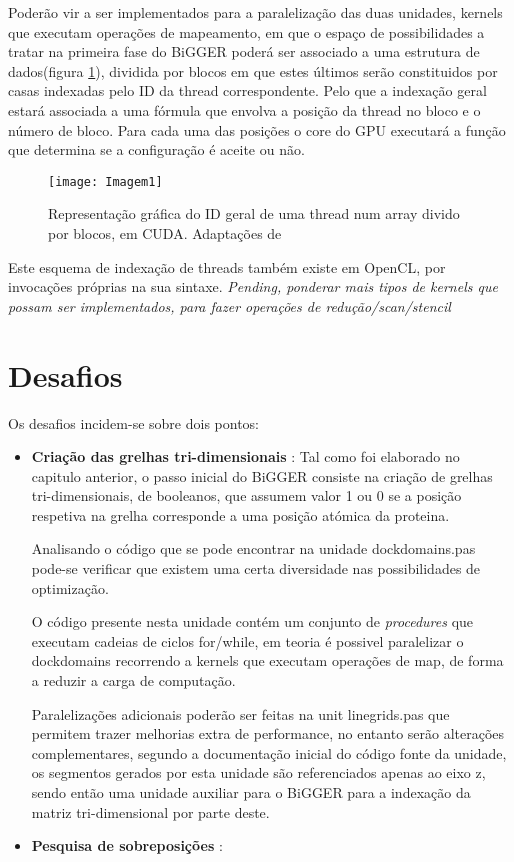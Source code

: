 Poderão vir a ser implementados para a paralelização das duas unidades, kernels que executam operações de mapeamento, em que o espaço de possibilidades a tratar na primeira fase do BiGGER poderá ser associado a uma estrutura de dados(figura \ref{fig:fig3subfig}), dividida por blocos em que estes últimos serão constituidos por casas indexadas pelo ID da thread correspondente. Pelo que a indexação geral estará associada a uma fórmula que envolva a posição da thread no bloco e o número de bloco. Para cada uma das posições o core do GPU executará a função que determina se a configuração é aceite ou não.

\begin{figure}[ht]
  \centering
    {\texttt{[image: Imagem1]}}
  \caption{Representação gráfica do ID geral de uma thread num array divido por blocos, em CUDA. Adaptações de \cite{Sainio2010CUDAEASYA} \cite{zeller2011cuda}}
  \label{fig:fig3subfig}
\end{figure}
Este esquema de indexação de threads também existe em OpenCL, por invocações próprias na sua sintaxe.
\textit{Pending, ponderar mais tipos de kernels que possam ser implementados, para fazer operações de redução/scan/stencil}

\section {Desafios}
\label{challenges}
Os desafios incidem-se sobre dois pontos:
\begin{itemize}
\item{\textbf{Criação das grelhas tri-dimensionais}} : 
Tal como foi elaborado no capitulo anterior, o passo inicial do BiGGER consiste na criação de grelhas tri-dimensionais, de booleanos, que assumem valor 1 ou 0 se a posição respetiva na grelha corresponde a uma posição atómica da proteina. 

Analisando o código que se pode encontrar na unidade dockdomains.pas pode-se verificar que existem uma certa diversidade nas possibilidades de optimização.  

O código presente nesta unidade contém um conjunto de \textit{procedures} que executam cadeias de ciclos for/while, em teoria é possivel paralelizar o dockdomains recorrendo a kernels que executam operações de map, de forma a reduzir a carga de computação.

Paralelizações adicionais poderão ser feitas na unit linegrids.pas que permitem trazer melhorias extra de performance, no entanto serão alterações complementares, segundo a documentação inicial do código fonte da unidade, os segmentos gerados por esta unidade são referenciados apenas ao eixo z, sendo então uma unidade auxiliar para o BiGGER para a indexação da matriz tri-dimensional por parte deste.

\item{\textbf{Pesquisa de sobreposições}} : 
\end{itemize}
